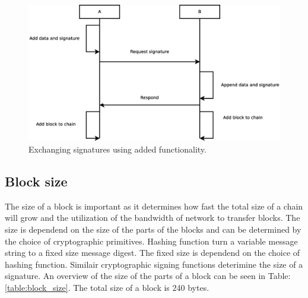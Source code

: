 \begin{figure}[tbp]
	\centerline{\includegraphics[scale=0.3]{design/figs/exchange_new.eps}}
	\caption{Exchanging signatures using added functionality.}
	\label{fig:exchange-new-sequence}
\end{figure}

\subsection{Block size}
The size of a block is important as it determines how fast the total size of a chain will grow
and the utilization of the bandwidth of network to transfer blocks.
The size is dependend on the size of the parts of the blocks
and can be determined by the choice of cryptographic primitives.
Hashing function turn a variable message string to a fixed size message digest\cite{VanderLubbe-crypto}.
The fixed size is dependend on the choice of hashing function.
Similair cryptographic signing functions deterimine the size of a signature.
An overview of the size of the parts of a block can be seen in Table: \ref{table:block_size}.
The total size of a block is 240 bytes.

